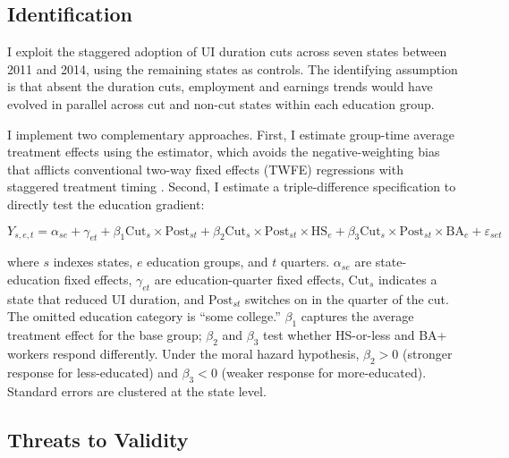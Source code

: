 \documentclass[12pt]{article}
\begin{document}
\subsection{Identification}

I exploit the staggered adoption of UI duration cuts across seven states between 2011 and 2014, using the remaining states as controls. The identifying assumption is that absent the duration cuts, employment and earnings trends would have evolved in parallel across cut and non-cut states within each education group.

I implement two complementary approaches. First, I estimate group-time average treatment effects using the \citet{callaway2021difference} estimator, which avoids the negative-weighting bias that afflicts conventional two-way fixed effects (TWFE) regressions with staggered treatment timing \citep{goodman2021difference, sun2021estimating, baker2025practitioner}. Second, I estimate a triple-difference specification to directly test the education gradient:

\begin{equation}
Y_{s,e,t} = \alpha_{se} + \gamma_{et} + \beta_1 \text{Cut}_s \times \text{Post}_{st} + \beta_2 \text{Cut}_s \times \text{Post}_{st} \times \text{HS}_{e} + \beta_3 \text{Cut}_s \times \text{Post}_{st} \times \text{BA}_{e} + \varepsilon_{set}
\label{eq:triple}
\end{equation}

\noindent where $s$ indexes states, $e$ education groups, and $t$ quarters. $\alpha_{se}$ are state-education fixed effects, $\gamma_{et}$ are education-quarter fixed effects, $\text{Cut}_s$ indicates a state that reduced UI duration, and $\text{Post}_{st}$ switches on in the quarter of the cut. The omitted education category is ``some college.'' $\beta_1$ captures the average treatment effect for the base group; $\beta_2$ and $\beta_3$ test whether HS-or-less and BA+ workers respond differently. Under the moral hazard hypothesis, $\beta_2 > 0$ (stronger response for less-educated) and $\beta_3 < 0$ (weaker response for more-educated). Standard errors are clustered at the state level.

\subsection{Threats to Validity}
\end{document}
